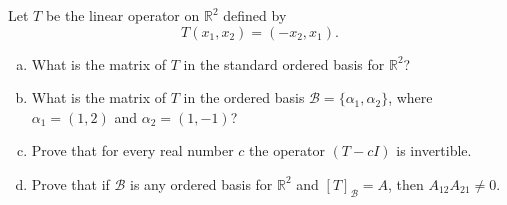 \begin{problem}
    Let \(T\) be the linear operator on \(\mathbb{R}^2\) defined by
    \[
    T(x_1,x_2)=(-x_2,x_1).
    \]
    \begin{enumerate}[(a)]
        \item What is the matrix of \(T\) in the standard ordered basis for \(\mathbb{R}^2\)?
        \item What is the matrix of \(T\) in the ordered basis \(\mathcal{B}=\{\alpha_1,\alpha_2\}\), where \(\alpha_1=(1,2)\) and \(\alpha_2=(1,-1)\)?
        \item Prove that for every real number \(c\) the operator \((T-cI)\) is invertible.
        \item Prove that if \(\mathcal{B}\) is any ordered basis for \(\mathbb{R}^2\) and \([T]_{\mathcal{B}}=A\), then \(A_{12}A_{21}\neq 0\).
    \end{enumerate}
\end{problem}
